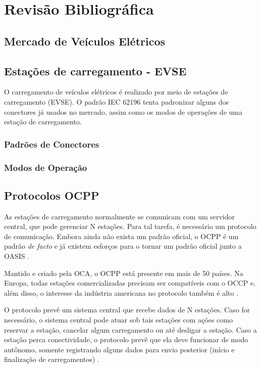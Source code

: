 \chapter{Revisão Bibliográfica}

\section{Mercado de Veículos Elétricos}

\section{Estações de carregamento - EVSE}

O carregamento de veículos elétricos é realizado por meio de estações de carregamento (EVSE). O padrão IEC 62196 \cite{iec-62196} tenta padronizar alguns dos conectores já usados no mercado, assim como os modos de operações de uma estação de carregamento.

\subsection{Padrões de Conectores}

\subsection{Modos de Operação}

\section{Protocolos OCPP}

As estações de carregamento normalmente se comunicam com um servidor central, que pode gerenciar N estações. Para tal tarefa, é necessário um protocolo de comunicação. Embora ainda não exista um padrão oficial, o \ac{OCPP} é um padrão \textit{de facto} e já existem esforços para o tornar um padrão oficial junto a \ac{OASIS} \cite{ocpp-news-standardization}.

Mantido e criado pela \ac{OCA}, o OCPP está presente em mais de 50 países. Na Europa, todas estações comercializadas precisam ser compatíveis com o OCCP e, além disso, o interesse da indústria americana no protocolo também é alto \cite{ocpp-news-forbes}.

O protocolo prevê um sistema central que recebe dados de N estações. Caso for necessário, o sistema central pode atuar sob tais estações com ações como reservar a estação, cancelar algum carregamento ou até desligar a estação. Caso a estação perca conectividade, o protocolo prevê que ela deve funcionar de modo autônomo, somente registrando alguns dados para envio posterior (início e finalização de carregamentos) \cite{ocpp-spec-15}.

